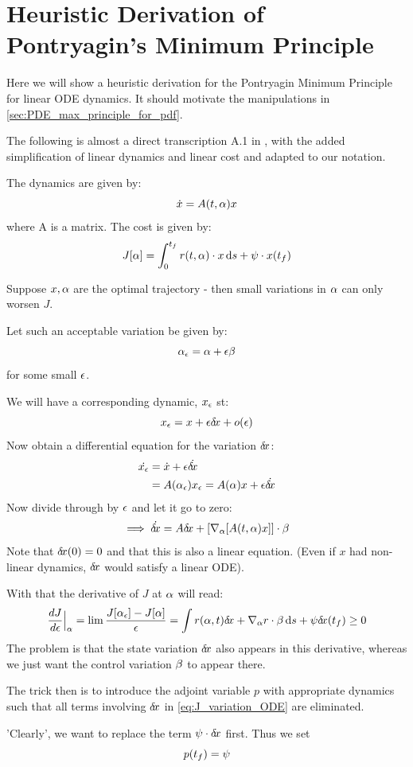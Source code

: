 \documentclass{article}
\begin{document}
\newpage
\appendix
\section{Heuristic Derivation of Pontryagin's Minimum Principle}
\label{sec:Pontryagin_heuristic_derivation}
Here we will show a heuristic derivation for the Pontryagin Minimum Principle
for linear ODE dynamics. It should motivate the manipulations in
\cref{sec:PDE_max_principle_for_pdf}.

The following is almost a direct transcription A.1 in
\cite{Evansb}, with the added simplification of linear dynamics
and linear cost and adapted to our notation.

The dynamics are given by:
$$
\dot{x} = A(t, {\alpha}) x
$$
where A is a matrix.
The cost is given by:
$$
J[{\alpha}] = \int_0^{ t_f } r(t,{\alpha}) \cdot x \, \mathrm{d} s + \psi \cdot x({ t_f })
$$

Suppose $x,{\alpha}$ are the optimal trajectory - then small variations in ${\alpha}$ can
only worsen $J$.

Let such an acceptable variation be given by:
$$
{\alpha}_{\epsilon} = {\alpha} + {\epsilon} {\beta}
$$
for some small ${\epsilon}$.

We will have a corresponding dynamic, $x_{\epsilon}$ st:
$$
x_{\epsilon} = x + {\epsilon} { \delta\! x}+ o({\epsilon})
$$
Now obtain a differential equation for the variation ${ \delta\! x}$:
\begin{align*}
\dot{x_{\epsilon}} &=  \dot{x} + {\epsilon} \dot{{ \delta\! x}} 
\\
&= A({\alpha}_{\epsilon}) x_{\epsilon} = A({\alpha}) x + {\epsilon} \dot{{ \delta\! x}}
\end{align*}
Now divide through by ${\epsilon}$ and let it go to zero:
$$
\implies \dot{{ \delta\! x}} = A { \delta\! x} + [{ \nabla }_{\alpha} [ A(t,{\alpha})x]] \cdot{\beta}
$$
Note that ${ \delta\! x}(0) = 0$ and that this is also a linear equation. (Even if $x$ had
non-linear dynamics, ${ \delta\! x}$ would satisfy a linear ODE).

With that the derivative of $J$ at ${\alpha}$ will read:
\begin{multline}
\frac {dJ}{d{\epsilon}} \Big|_{{\alpha}} = \lim \frac{ J[{\alpha}_{\epsilon}] - J[{\alpha}]}{{\epsilon}} 
= \int r({\alpha},t) { \delta\! x} +  { \nabla }_{\alpha} r \cdot {\beta} \, \mathrm{d} s + \psi { \delta\! x}({ t_f })
\geq 0 
\label{eq:J_variation_ODE}
\end{multline}
The problem is that the state variation ${ \delta\! x}$ also appears in this derivative,
whereas we just want the control variation ${\beta}$ to appear there.

The trick then is to introduce the adjoint variable $p$ with appropriate
dynamics such that all terms involving ${ \delta\! x}$ in \cref{eq:J_variation_ODE} are
eliminated.

'Clearly', we want to replace the term $ \psi \cdot { \delta\! x} $ first. Thus we set 
$$
p({ t_f }) = \psi
$$
\end{document}
